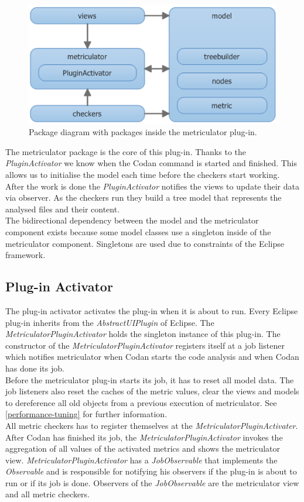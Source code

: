 \documentclass[11pt,a4paper,oneside]{scrreprt}
\begin{document}
\begin{figure}[th]
\begin{center}
\includegraphics{figures/model_metriculator_packages.png}
\end{center}
\caption{Package diagram with packages inside the metriculator plug-in.}
\label{fig:metriculator_packages}
\end{figure}

The metriculator package is the core of this plug-in. Thanks to the \textit{PluginActivator} we know when the Codan command is started and finished. This allows us to initialise the model each time before the checkers start working. After the work is done the \textit{PluginActivator} notifies the views to update their data via observer. As the checkers run they build a tree model that represents the analysed files and their content.\\
The bidirectional dependency between the model and the metriculator component exists because some model classes use a singleton inside of the metriculator component. Singletons are used due to constraints of the Eclipse framework.

\subsection{Plug-in Activator}
The plug-in activator activates the plug-in when it is about to run.
Every Eclipse plug-in inherits from the \textit{AbstractUIPlugin} of Eclipse. The \textit{MetriculatorPluginActivator} holds the singleton instance of this plug-in. The constructor of the \textit{MetriculatorPluginActivator} registers itself at a job listener which notifies metriculator when Codan starts the code analysis and when Codan has done its job.\\
Before the metriculator plug-in starts its job, it has to reset all model data. The job listeners also reset the caches of the metric values, clear the views and models to dereference all old objects from a previous execution of metriculator. See \ref{performance-tuning} for further information.\\
All metric checkers has to register themselves at the \textit{MetriculatorPluginActivater}.
After Codan has finished its job, the \textit{MetriculatorPluginActivator} invokes the aggregation of all values of the activated metrics and shows the metriculator view. \textit{MetriculatorPluginActivator} has a \textit{JobObservable} that implements the \textit{Observable} and is responsible for notifying his observers if the plug-in is about to run or if its job is done. Observers of the \textit{JobObservable} are the metriculator view and all metric checkers.
\end{document}
